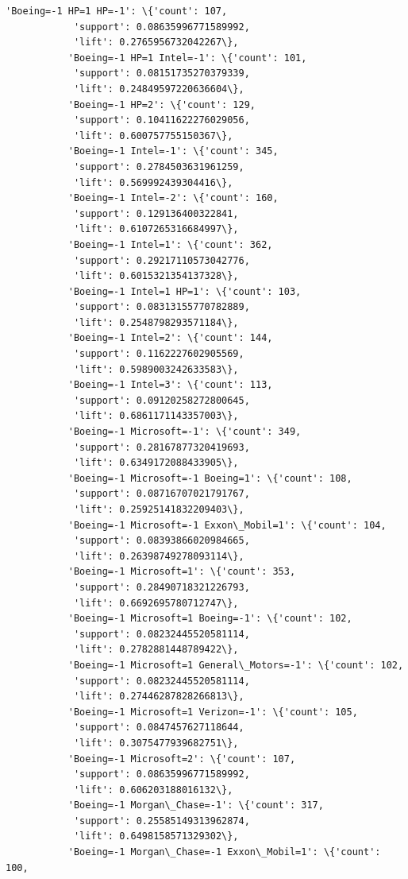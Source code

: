 \documentclass[11pt]{article}
\begin{document}
\begin{Verbatim}[commandchars=\\\{\}]
           'Boeing=-1 HP=1 HP=-1': \{'count': 107,
            'support': 0.08635996771589992,
            'lift': 0.2765956732042267\},
           'Boeing=-1 HP=1 Intel=-1': \{'count': 101,
            'support': 0.08151735270379339,
            'lift': 0.24849597220636604\},
           'Boeing=-1 HP=2': \{'count': 129,
            'support': 0.10411622276029056,
            'lift': 0.600757755150367\},
           'Boeing=-1 Intel=-1': \{'count': 345,
            'support': 0.2784503631961259,
            'lift': 0.569992439304416\},
           'Boeing=-1 Intel=-2': \{'count': 160,
            'support': 0.129136400322841,
            'lift': 0.6107265316684997\},
           'Boeing=-1 Intel=1': \{'count': 362,
            'support': 0.29217110573042776,
            'lift': 0.6015321354137328\},
           'Boeing=-1 Intel=1 HP=1': \{'count': 103,
            'support': 0.08313155770782889,
            'lift': 0.2548798293571184\},
           'Boeing=-1 Intel=2': \{'count': 144,
            'support': 0.1162227602905569,
            'lift': 0.5989003242633583\},
           'Boeing=-1 Intel=3': \{'count': 113,
            'support': 0.09120258272800645,
            'lift': 0.6861171143357003\},
           'Boeing=-1 Microsoft=-1': \{'count': 349,
            'support': 0.28167877320419693,
            'lift': 0.6349172088433905\},
           'Boeing=-1 Microsoft=-1 Boeing=1': \{'count': 108,
            'support': 0.08716707021791767,
            'lift': 0.25925141832209403\},
           'Boeing=-1 Microsoft=-1 Exxon\_Mobil=1': \{'count': 104,
            'support': 0.08393866020984665,
            'lift': 0.26398749278093114\},
           'Boeing=-1 Microsoft=1': \{'count': 353,
            'support': 0.28490718321226793,
            'lift': 0.6692695780712747\},
           'Boeing=-1 Microsoft=1 Boeing=-1': \{'count': 102,
            'support': 0.08232445520581114,
            'lift': 0.2782881448789422\},
           'Boeing=-1 Microsoft=1 General\_Motors=-1': \{'count': 102,
            'support': 0.08232445520581114,
            'lift': 0.27446287828266813\},
           'Boeing=-1 Microsoft=1 Verizon=-1': \{'count': 105,
            'support': 0.0847457627118644,
            'lift': 0.3075477939682751\},
           'Boeing=-1 Microsoft=2': \{'count': 107,
            'support': 0.08635996771589992,
            'lift': 0.606203188016132\},
           'Boeing=-1 Morgan\_Chase=-1': \{'count': 317,
            'support': 0.25585149313962874,
            'lift': 0.6498158571329302\},
           'Boeing=-1 Morgan\_Chase=-1 Exxon\_Mobil=1': \{'count': 100,

\end{Verbatim}
\end{document}
